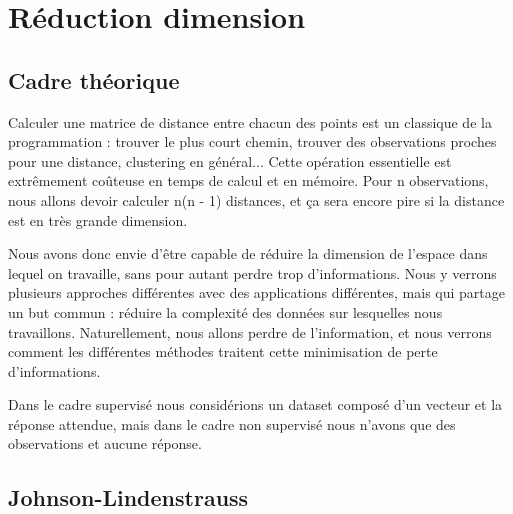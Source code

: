 \chapter{Réduction dimension}

\section{Cadre théorique}
Calculer une matrice de distance entre chacun des points est un classique de la programmation : trouver le plus court chemin, trouver des observations proches pour une distance, clustering en général... Cette opération essentielle est extrêmement coûteuse en temps de calcul et en mémoire. Pour n observations, nous allons devoir calculer n(n - 1) distances, et ça sera encore pire si la distance est en très grande dimension.


Nous avons donc envie d’être capable de réduire la dimension de l’espace dans lequel on travaille, sans pour autant perdre trop d’informations. Nous y verrons plusieurs approches différentes avec des applications différentes, mais qui partage un but commun : réduire la complexité des données sur lesquelles nous travaillons. Naturellement, nous allons perdre de l’information, et nous verrons comment les différentes méthodes traitent cette minimisation de perte d’informations.


Dans le cadre supervisé nous considérions un dataset composé d’un vecteur et la réponse attendue, mais dans le cadre non supervisé nous n’avons que des observations et aucune réponse. 

\newpage


\section{Johnson-Lindenstrauss}
